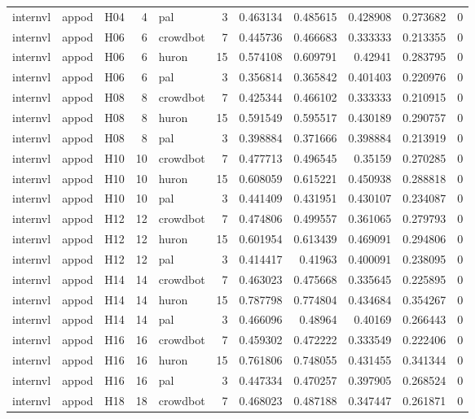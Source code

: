 \begin{longtable}{lllrlrrrrrr}
internvl & appod & H04 & 4 & pal & 3 & 0.463134 & 0.485615 & 0.428908 & 0.273682 & 0 \\
internvl & appod & H06 & 6 & crowdbot & 7 & 0.445736 & 0.466683 & 0.333333 & 0.213355 & 0 \\
internvl & appod & H06 & 6 & huron & 15 & 0.574108 & 0.609791 & 0.42941 & 0.283795 & 0 \\
internvl & appod & H06 & 6 & pal & 3 & 0.356814 & 0.365842 & 0.401403 & 0.220976 & 0 \\
internvl & appod & H08 & 8 & crowdbot & 7 & 0.425344 & 0.466102 & 0.333333 & 0.210915 & 0 \\
internvl & appod & H08 & 8 & huron & 15 & 0.591549 & 0.595517 & 0.430189 & 0.290757 & 0 \\
internvl & appod & H08 & 8 & pal & 3 & 0.398884 & 0.371666 & 0.398884 & 0.213919 & 0 \\
internvl & appod & H10 & 10 & crowdbot & 7 & 0.477713 & 0.496545 & 0.35159 & 0.270285 & 0 \\
internvl & appod & H10 & 10 & huron & 15 & 0.608059 & 0.615221 & 0.450938 & 0.288818 & 0 \\
internvl & appod & H10 & 10 & pal & 3 & 0.441409 & 0.431951 & 0.430107 & 0.234087 & 0 \\
internvl & appod & H12 & 12 & crowdbot & 7 & 0.474806 & 0.499557 & 0.361065 & 0.279793 & 0 \\
internvl & appod & H12 & 12 & huron & 15 & 0.601954 & 0.613439 & 0.469091 & 0.294806 & 0 \\
internvl & appod & H12 & 12 & pal & 3 & 0.414417 & 0.41963 & 0.400091 & 0.238095 & 0 \\
internvl & appod & H14 & 14 & crowdbot & 7 & 0.463023 & 0.475668 & 0.335645 & 0.225895 & 0 \\
internvl & appod & H14 & 14 & huron & 15 & 0.787798 & 0.774804 & 0.434684 & 0.354267 & 0 \\
internvl & appod & H14 & 14 & pal & 3 & 0.466096 & 0.48964 & 0.40169 & 0.266443 & 0 \\
internvl & appod & H16 & 16 & crowdbot & 7 & 0.459302 & 0.472222 & 0.333549 & 0.222406 & 0 \\
internvl & appod & H16 & 16 & huron & 15 & 0.761806 & 0.748055 & 0.431455 & 0.341344 & 0 \\
internvl & appod & H16 & 16 & pal & 3 & 0.447334 & 0.470257 & 0.397905 & 0.268524 & 0 \\
internvl & appod & H18 & 18 & crowdbot & 7 & 0.468023 & 0.487188 & 0.347447 & 0.261871 & 0 \\

\end{longtable}
